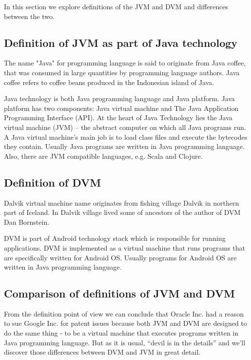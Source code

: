 \documentclass[11pt, oneside]{article}   	%
\begin{document}
In this section we explore definitions of the JVM and DVM and differences between the two.


\subsection{Definition of JVM as part of Java technology}

The name "Java" for programming language is said to originate from Java coffee, that was consumed in large quantities by programming language authors\cite{website:javahistorywiki}. Java coffee refers to coffee beans produced in the Indonesian island of Java\cite{website:javacoffeewiki}. 

Java technology is both Java programming language and Java platform. Java platform has two components: Java virtual machine and The Java Application Programming Interface (API)\cite{website:javadefinitions}. At the heart of Java Technology lies the Java virtual machine (JVM) -- the abstract computer on which all Java programs run. A Java virtual machine's main job is to load class files and execute the bytecodes they contain. Usually Java programs are written in Java programming language. Also, there are JVM compatible languages, e.g. Scala and Clojure\cite{jvm_compatible_languages}.

\subsection{Definition of DVM}

Dalvik virtual machine name originates from fishing village Dalvik in northern part of Iceland\cite{bornstein2008dalvik}. In Dalvik village lived some of ancestors of the author of DVM Dan Bornstein.

DVM is part of Android technology stack which is responsible for running applications. DVM is implemented as a virtual machine that runs programs that are specifically written for Android OS. Usually programs for Android OS are written in Java programming language.

\subsection{Comparison of definitions of JVM and DVM}

From the definition point of view we can conclude that Oracle Inc. had a reason to sue Google Inc. for patent issues because both JVM and DVM are designed to do the same thing - to be a virtual machine that executes programs written in Java programming language. But as it is usual, ``devil is in the details'' and we'll discover those differences between DVM and JVM in great detail. 
\end{document}
